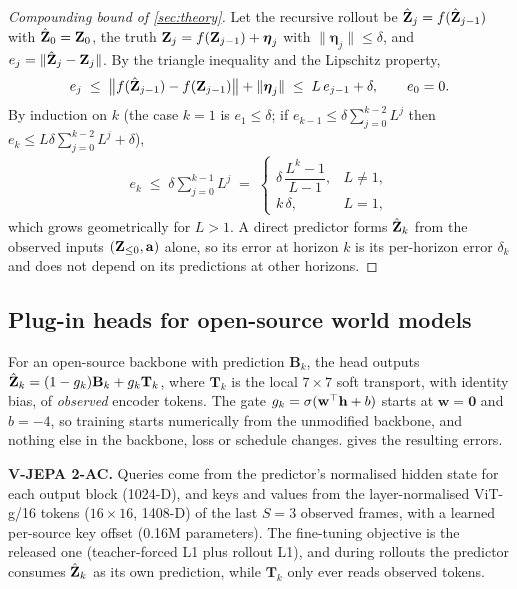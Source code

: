 \begin{proof}[Compounding bound of \cref{sec:theory}]
Let the recursive rollout be $\hat{\mathbf{Z}}_j=f(\hat{\mathbf{Z}}_{j-1})$ with $\hat{\mathbf{Z}}_0=\mathbf{Z}_0$, the truth
$\mathbf{Z}_j=f(\mathbf{Z}_{j-1})+\boldsymbol{\eta}_j$ with $\|\bm{\eta}_j\|\le\delta$, and $e_j=\|\hat{\mathbf{Z}}_j-\mathbf{Z}_j\|$. By the triangle inequality
and the Lipschitz property,
\begin{align}
e_j\;\le\;\big\|f(\hat{\mathbf{Z}}_{j-1})-f(\mathbf{Z}_{j-1})\big\|+\|\boldsymbol{\eta}_j\|\;\le\;L\,e_{j-1}+\delta,\qquad e_0=0 .
\end{align}
By induction on $k$ (the case $k=1$ is $e_1\le\delta$; if $e_{k-1}\le\delta\sum_{j=0}^{k-2}L^j$ then
$e_k\le L\delta\sum_{j=0}^{k-2}L^j+\delta$),
\begin{align}
e_k\;\le\;\delta\sum_{j=0}^{k-1}L^j\;=\;
\begin{cases}\delta\,\dfrac{L^k-1}{L-1}, & L\neq 1,\\[4pt] k\,\delta, & L=1,\end{cases}
\end{align}
which grows geometrically for $L>1$. A direct predictor forms $\hat{\mathbf{Z}}_k$ from the observed inputs
$(\mathbf{Z}_{\le 0},\mathbf{a})$ alone, so its error at horizon $k$ is its per-horizon error $\delta_k$ and does not depend on
its predictions at other horizons.
\end{proof}

\subsection{Plug-in heads for open-source world models}\label{app:plugin}

For an open-source backbone with prediction $\mathbf{B}_k$, the head outputs $\hat{\mathbf{Z}}_k=(1-g_k)\mathbf{B}_k+g_k\mathbf{T}_k$,
where $\mathbf{T}_k$ is the local $7{\times}7$ soft transport, with identity bias, of \emph{observed} encoder tokens.
%
The gate $g_k=\sigma(\mathbf{w}^\top\mathbf{h}+b)$ starts at $\mathbf{w}=\mathbf{0}$ and $b=-4$, so training starts numerically
from the unmodified backbone, and nothing else in the backbone, loss or schedule changes.
%
 gives the resulting errors.

\textbf{V-JEPA 2-AC.} Queries come from the predictor's normalised hidden state for each output block (1024-D), and
keys and values from the layer-normalised ViT-g/16 tokens ($16{\times}16$, 1408-D) of the last $S{=}3$ observed frames,
with a learned per-source key offset (0.16M parameters).
%
The fine-tuning objective is the released one (teacher-forced L1 plus rollout L1), and during rollouts the predictor
consumes $\hat{\mathbf{Z}}_k$ as its own prediction, while $\mathbf{T}_k$ only ever reads observed tokens.

